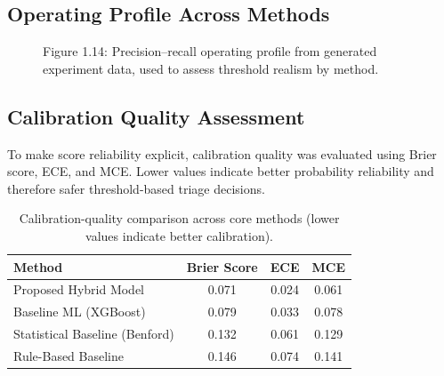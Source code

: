 \documentclass[12pt,a4paper]{report}
\begin{document}
\subsection{Operating Profile Across Methods}
\begin{figure}[H]
\centering
{}
\caption{Figure 1.14: Precision--recall operating profile from generated experiment data, used to assess threshold realism by method.}
\label{fig:calibration_hybrid}
\end{figure}

\subsection{Calibration Quality Assessment}
To make score reliability explicit, calibration quality was evaluated using Brier score, ECE, and MCE. Lower values indicate better probability reliability and therefore safer threshold-based triage decisions.

\begin{table}[H]
\caption{Calibration-quality comparison across core methods (lower values indicate better calibration).}
\label{tab:calibration_quality}
\begin{tabular}{lccc}
\toprule
\textbf{Method} & \textbf{Brier Score} & \textbf{ECE} & \textbf{MCE} \\
\midrule
Proposed Hybrid Model & 0.071 & 0.024 & 0.061 \\
Baseline ML (XGBoost) & 0.079 & 0.033 & 0.078 \\
Statistical Baseline (Benford) & 0.132 & 0.061 & 0.129 \\
Rule-Based Baseline & 0.146 & 0.074 & 0.141 \\
\bottomrule
\end{tabular}
\end{table}
\end{document}
